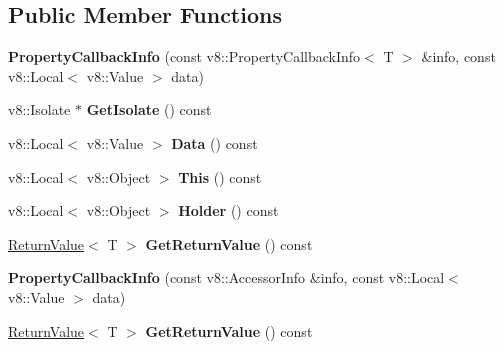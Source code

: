 \subsection*{Public Member Functions}
\begin{DoxyCompactItemize}
\item 
\mbox{\label{class_property_callback_info_a68369532bba5ffb02ee1f0642a8bd8f8}} 
{\bfseries Property\+Callback\+Info} (const v8\+::\+Property\+Callback\+Info$<$ T $>$ \&info, const v8\+::\+Local$<$ v8\+::\+Value $>$ data)
\item 
\mbox{\label{class_property_callback_info_a2589ed045a84c4e450a908a723f259f4}} 
v8\+::\+Isolate $\ast$ {\bfseries Get\+Isolate} () const
\item 
\mbox{\label{class_property_callback_info_a8cfc0741e91881ce17e5baa88538cf20}} 
v8\+::\+Local$<$ v8\+::\+Value $>$ {\bfseries Data} () const
\item 
\mbox{\label{class_property_callback_info_a62e1b7130b63eeb255751a0322c66544}} 
v8\+::\+Local$<$ v8\+::\+Object $>$ {\bfseries This} () const
\item 
\mbox{\label{class_property_callback_info_aedb202bf1b5c3b4f260da02ed69438b0}} 
v8\+::\+Local$<$ v8\+::\+Object $>$ {\bfseries Holder} () const
\item 
\mbox{\label{class_property_callback_info_a1b8c377cfff5009adec5d1135fc25e00}} 
\hyperlink{class_return_value}{Return\+Value}$<$ T $>$ {\bfseries Get\+Return\+Value} () const
\item 
\mbox{\label{class_property_callback_info_a6f484caf6906981f387de1d3a57bcae4}} 
{\bfseries Property\+Callback\+Info} (const v8\+::\+Accessor\+Info \&info, const v8\+::\+Local$<$ v8\+::\+Value $>$ data)
\item 
\mbox{\label{class_property_callback_info_a1b8c377cfff5009adec5d1135fc25e00}} 
\hyperlink{class_return_value}{Return\+Value}$<$ T $>$ {\bfseries Get\+Return\+Value} () const
\end{DoxyCompactItemize}
